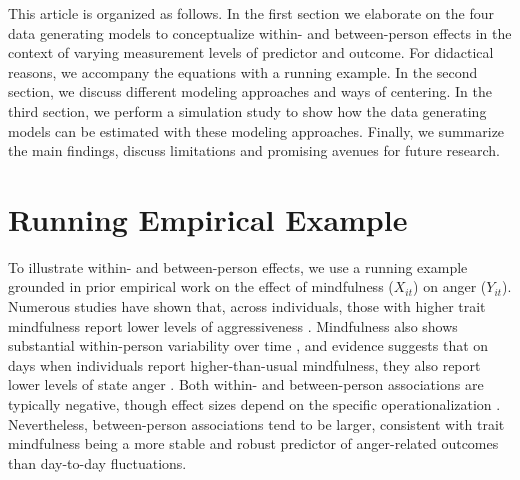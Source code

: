 \documentclass[stu]{apa7}
\begin{document}

This article is organized as follows. In the first section we elaborate on the four data generating models to conceptualize within- and between-person effects in the context of varying measurement levels of predictor and outcome. For didactical reasons, we accompany the equations with a running example. In the second section, we discuss different modeling approaches and ways of centering. In the third section, we perform a simulation study to show how the data generating models can be estimated with these modeling approaches. Finally, we summarize the main findings, discuss limitations and promising avenues for future research.

    

\section{Running Empirical Example}

To illustrate within- and between-person effects, we use a running example grounded in prior empirical work on the effect of mindfulness (\(X_{it}\)) on anger (\(Y_{it}\)). Numerous studies have shown that, across individuals, those with higher trait mindfulness report lower levels of aggressiveness \parencite[]{brown_benefits_2003, borders_could_2010, kashdan_what_2016, baer_relationships_2011, eisenlohr-moul_both_2016}. Mindfulness also shows substantial within-person variability over time \parencite[]{brown_benefits_2003, kiken_state_2015}, and evidence suggests that on days when individuals report higher-than-usual mindfulness, they also report lower levels of state anger \parencite[]{eisenlohr-moul_both_2016}. Both within- and between-person associations are typically negative, though effect sizes depend on the specific operationalization \parencite{eisenlohr-moul_both_2016}. Nevertheless, between-person associations tend to be larger, consistent with trait mindfulness being a more stable and robust predictor of anger-related outcomes than day-to-day fluctuations.
\end{document}
